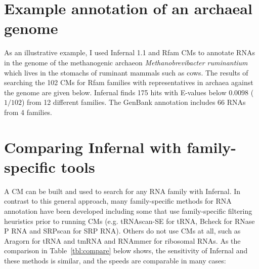 \documentclass[custom,landscape,final,30pt,plainboxedsections]{sciposter-titleskipsmall}
\begin{document}
\begin{multicols}{3}
\columnbreak

\section*{Example annotation of an archaeal genome}

As an illustrative example, I used Infernal 1.1 and Rfam CMs to annotate
RNAs in the genome of the methanogenic archaeon
\emph{Methanobrevibacter ruminantium} which lives in the stomachs of
ruminant mammals such as cows. The results of searching the 102 CMs for
Rfam families with representatives in archaea against the genome are
given below.  Infernal finds 175 hits with E-values below $0.0098$ ($1/102$)
from 12 different families. The GenBank annotation includes 
66 RNAs from 4 families.



\vspace{0.5in}

\section*{Comparing Infernal with family-specific tools}

A CM can be built and used to search for any RNA family with Infernal.
In contrast to this general approach, many family-specific methods for
RNA annotation have been developed including some that use
family-specific filtering heuristics prior to running CMs (e.g. 
tRNAscan-SE\cite{LoweEddy97} for tRNA, Bcheck\cite{Yusuf10} for RNase
P RNA and SRPscan\cite{Regalia02} for SRP RNA). Others do not use CMs
at all, such as Aragorn for tRNA and tmRNA and RNAmmer\cite{Lagesen07}
for ribosomal RNAs. As the comparison in Table~\ref{tbl:compare} below
shows, the sensitivity of Infernal and these methods is similar,
and the speeds are comparable in many cases:



\end{multicols}
\end{document}
